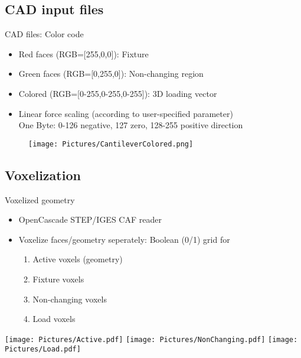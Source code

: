 \subsection{CAD input files}
\begin{frame}{CAD files: Color code}

\begin{itemize}
\item Red faces (RGB=[255,0,0]): Fixture
\item Green faces (RGB=[0,255,0]): Non-changing region  
\item Colored (RGB=[0-255,0-255,0-255]): 3D loading vector 
\item Linear force scaling (according to user-specified parameter)\\
One Byte: 0-126 negative, 127 zero, 128-255 positive direction
\end{itemize}
\begin{figure}
\centering
\texttt{[image: Pictures/CantileverColored.png]}
\end{figure}
\end{frame}

\subsection{Voxelization}
\begin{frame}{Voxelized geometry}
\begin{itemize}
\item OpenCascade STEP/IGES CAF reader 
\item Voxelize faces/geometry seperately: Boolean (0/1) grid for 
\begin{enumerate}
\item Active voxels (geometry)
\item Fixture voxels
\item Non-changing voxels
\item Load voxels
\end{enumerate}
\end{itemize}
\texttt{[image: Pictures/Active.pdf]}
\hspace{1cm}
\texttt{[image: Pictures/NonChanging.pdf]}
\hspace{1cm}
\texttt{[image: Pictures/Load.pdf]}
\end{frame}

